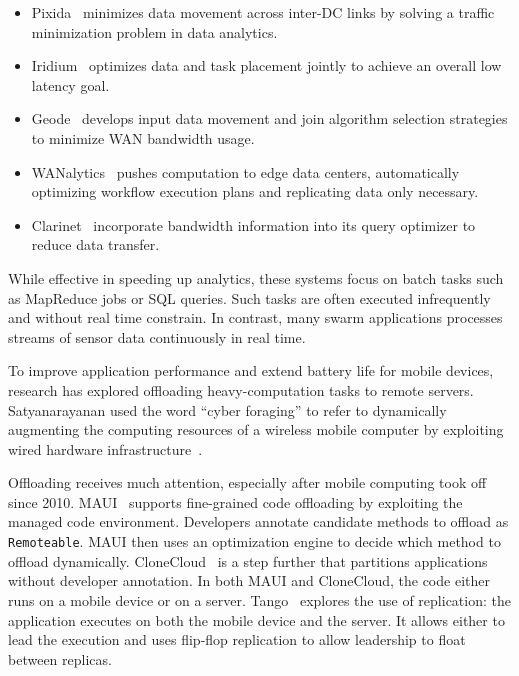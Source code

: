 \documentclass[thesis.tex]{subfiles}
\begin{document}
\begin{itemize}[topsep=5pt, leftmargin=20pt, itemsep=2pt]

\item Pixida~\cite{kloudas2015pixida} minimizes data movement across inter-DC
  links by solving a traffic minimization problem in data analytics.

\item Iridium~\cite{pu2015low} optimizes data and task placement jointly to
  achieve an overall low latency goal.

\item Geode~\cite{vulimiri2015global} develops input data movement and join
  algorithm selection strategies to minimize WAN bandwidth usage.

\item WANalytics~\cite{vulimiri2015wananlytics} pushes computation to edge data
  centers, automatically optimizing workflow execution plans and replicating
  data only necessary.

\item Clarinet~\cite{viswanathan2016clarinet} incorporate bandwidth information
  into its query optimizer to reduce data transfer.


\end{itemize}

While effective in speeding up analytics, these systems focus on batch tasks
such as MapReduce jobs or SQL queries. Such tasks are often executed
infrequently and without real time constrain. In contrast, many swarm
applications processes streams of sensor data continuously in real time.

 To improve application performance
and extend battery life for mobile devices, research has explored offloading
heavy-computation tasks to remote servers. Satyanarayanan used the word ``cyber
foraging'' to refer to dynamically augmenting the computing resources of a
wireless mobile computer by exploiting wired hardware
infrastructure~\cite{satyanarayanan2001pervasive, satyanarayanan2015brief}.

Offloading receives much attention, especially after mobile computing took off
since 2010. MAUI~\cite{cuervo2010maui} supports fine-grained code offloading by
exploiting the managed code environment. Developers annotate candidate methods
to offload as \texttt{Remoteable}. MAUI then uses an optimization engine to
decide which method to offload dynamically. CloneCloud~\cite{chun2011clonecloud}
is a step further that partitions applications without developer annotation. In
both MAUI and CloneCloud, the code either runs on a mobile device or on a
server. Tango~\cite{gordon2015accelerating} explores the use of replication: the
application executes on both the mobile device and the server. It allows either
to lead the execution and uses flip-flop replication to allow leadership to
float between replicas.
\end{document}
